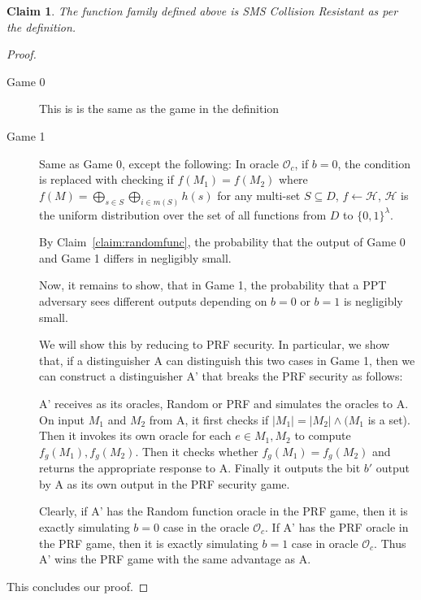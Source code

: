 \documentclass{article}
\newtheorem{claim}{Claim}
\newcommand{\hashFamily}{\mathcal{H}}
\newcommand{\XOR}{\bigoplus}
\begin{document}
 \begin{claim} The function family defined above is SMS Collision Resistant as per the definition.
 \end{claim}
 \begin{proof}
 \begin{description}
 \item [Game 0] This is is the same as the game in the definition
 \item [Game 1] Same as Game 0, except the following:
 In oracle $\mathcal{O}_c$, if $b=0$, the condition is replaced with checking if $f(M_1)=f(M_2)$ where  $f(M)=\XOR_{s\in S} \XOR_{i \in m(S)} h(s)$ for any multi-set $S \subseteq D$, $f \leftarrow \hashFamily$, $\hashFamily$ is the uniform distribution over the set of all functions from $D$ to $\{0,1\}^\lambda$.
 
 By Claim~\ref{claim:randomfunc}, the probability that the output of Game 0 and Game 1 differs in negligibly small.

Now, it remains to show, that in Game 1, the probability that a PPT adversary sees different outputs depending on $b=0$ or $ b=1$ is negligibly small.

We will show this by reducing to PRF security. In particular, we show that, if a distinguisher A can distinguish this two cases in Game 1, then we can construct a distinguisher A' that breaks the PRF security as follows:

A' receives as its oracles, Random or PRF and simulates the oracles to A. On input $M_1$ and $M_2$ from A, it first checks if $|M_1| = |M_2| \wedge (M_1$ is a set). Then it invokes its own oracle for each $e \in M_1, M_2$ to compute $f_g(M_1),f_g(M_2)$. Then it checks whether $f_g(M_1)=f_g(M_2)$ and returns the appropriate response to A. Finally it outputs the bit $b'$ output by A as its own output in the PRF security game.

Clearly, if A' has the Random function oracle in the PRF game, then it is exactly simulating $b=0$ case in the oracle $\mathcal{O}_c$. If A' has the PRF oracle in the PRF game, then it is exactly simulating $b=1$ case in oracle $\mathcal{O}_c$. Thus A' wins the PRF game with the same advantage as A.
 \end{description}
 
 This concludes our proof.
 
 
 \end{proof}
 
 
\end{document}
